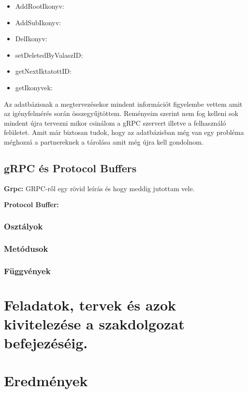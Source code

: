 \documentclass[conference]{IEEEtran}
\begin{document}
\begin{itemize}
	\item AddRootIkonyv:
	\item AddSubIkonyv:
	\item DelIkonyv:
	\item setDeletedByValaszID:
	\item getNextIktatottID:
	\item getIkonyvek:
\end{itemize} 

Az adatbázisnak a megtervezésekor mindent információt figyelembe vettem amit az igényfelmérés során összegyűjtöttem. Reményeim szerint nem fog kelleni sok mindent újra tervezni mikor csinálom a gRPC szervert illetve a felhasználó felületet. Amit már biztosan tudok, hogy az adatbázisban még van egy probléma méghozzá a partnereknek a tárolása amit még újra kell gondolnom.
\subsection{\textbf{gRPC és Protocol Buffers}}
\textbf{Grpc:}
GRPC-ről egy rövid leírás és hogy meddig jutottam vele.

\textbf{Protocol Buffer:}
\subsubsection{Osztályok}

\subsubsection{Metódusok}


\subsubsection{Függvények}



\section*{Feladatok, tervek és azok kivitelezése a szakdolgozat befejezéséig.}



\section*{Eredmények}
\end{document}
